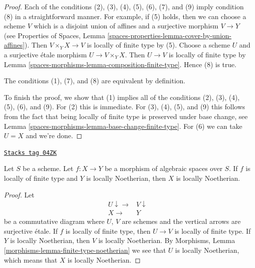 \begin{proof}
Each of the conditions (2), (3), (4), (5), (6), (7), and (9)
imply condition (8) in a straightforward manner. For example, if
(5) holds, then we can choose a scheme $V$ which is a disjoint
union of affines and a surjective morphism $V \to Y$
(see Properties of Spaces, Lemma
\ref{spaces-properties-lemma-cover-by-union-affines}).
Then $V \times_Y X \to V$ is locally of finite type by (5).
Choose a scheme $U$ and a surjective \'etale morphism
$U \to V \times_Y X$. Then $U \to V$ is locally of finite
type by Lemma \ref{spaces-morphisms-lemma-composition-finite-type}.
Hence (8) is true.

\medskip\noindent
The conditions (1), (7), and (8) are equivalent by definition.

\medskip\noindent
To finish the proof, we show that (1) implies all of the conditions
(2), (3), (4), (5), (6), and (9). For (2) this is immediate.
For (3), (4), (5), and (9) this follows from the fact that being
locally of finite type is preserved under base change, see
Lemma \ref{spaces-morphisms-lemma-base-change-finite-type}.
For (6) we can take $U = X$ and we're done.
\end{proof}

\begin{lemma}
\label{spaces-morphisms-lemma-locally-finite-type-locally-noetherian}
\href{https://stacks.math.columbia.edu/tag/04ZK}{\texttt{Stacks tag 04ZK}}

Let $S$ be a scheme.
Let $f : X \to Y$ be a morphism of algebraic spaces over $S$.
If $f$ is locally of finite type and $Y$ is locally Noetherian,
then $X$ is locally Noetherian.
\end{lemma}

\begin{proof}
Let
$$
\begin{array}{cc}U \downarrow\longrightarrow & V \downarrow \\ X \longrightarrow & Y\end{array}
$$
be a commutative diagram where $U$, $V$ are schemes and the vertical arrows
are surjective \'etale. If $f$ is locally of finite type, then
$U \to V$ is locally of finite type. If $Y$ is locally Noetherian, then
$V$ is locally Noetherian. By
Morphisms, Lemma \ref{morphisms-lemma-finite-type-noetherian}
we see that $U$ is locally Noetherian, which means that $X$ is locally
Noetherian.
\end{proof}

